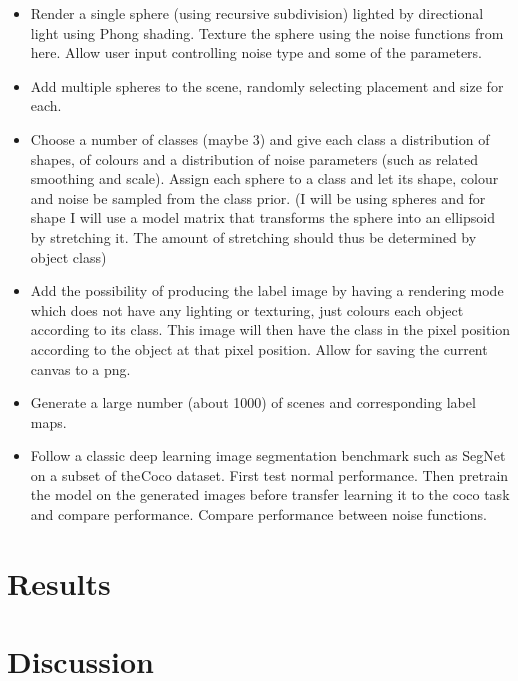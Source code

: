 \documentclass[12pt,fleqn]{article}
\begin{document}
\begin{itemize}
    \item Render a single sphere (using recursive subdivision) lighted by directional light using Phong shading. Texture the sphere using the noise functions from here. Allow user input controlling noise type and some of the parameters.
    \item Add multiple spheres to the scene, randomly selecting placement and size for each.
    \item Choose a number of classes (maybe 3) and give each class a distribution of shapes, of colours and a distribution of noise parameters (such as related smoothing and scale). Assign each sphere to a class and let its shape, colour and noise be sampled from the class prior. (I will be using spheres and for shape I will use a model matrix that transforms the sphere into an ellipsoid by stretching it. The amount of stretching should thus be determined by object class)
    \item Add the possibility of producing the label image by having a rendering mode which does not have any lighting or texturing, just colours each object according to its class. This image will then have the class in the pixel position according to the object at that pixel position. Allow for saving the current canvas to a png.
    \item Generate a large number (about 1000) of scenes and corresponding label maps.
    \item Follow a classic deep learning image segmentation benchmark such as SegNet on a subset of the Coco dataset. First test normal performance. Then pretrain the model on the generated images before transfer learning it to the coco task and compare performance. Compare performance between noise functions.
\end{itemize}

\section{Results}%
\label{sec:results}

\section{Discussion}%
\label{sec:disc}
\end{document}
